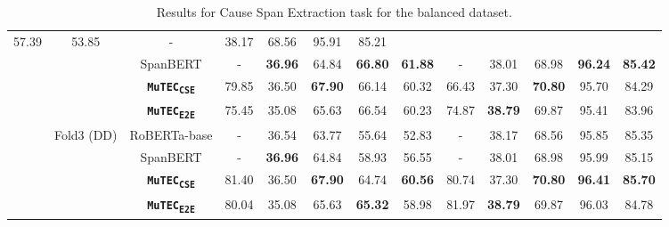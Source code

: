 \documentclass{article}
\newcommand{\subone}{\textbf{\texttt{MuTEC\textsubscript{CSE}}}}
\newcommand{\overall}{\textbf{\texttt{MuTEC\textsubscript{E2E}}}}
\begin{document}
\begin{table*}[h]
{\begin{tabular}{|c|c|c|ccccc|ccccc|}
  \multicolumn{1}{c|}{57.39} &
  53.85 &
  \multicolumn{1}{c|}{-} &
  \multicolumn{1}{c|}{38.17} &
  \multicolumn{1}{c|}{68.56} &
  \multicolumn{1}{c|}{95.91} &
  85.21
   \\ \cline{3-13} 
 &
   &
  SpanBERT &
  \multicolumn{1}{c|}{-} &
  \multicolumn{1}{c|}{\textbf{36.96}} &
  \multicolumn{1}{c|}{64.84} &
  \multicolumn{1}{c|}{\textbf{66.80}} &
   \textbf{61.88} &
  \multicolumn{1}{c|}{-} &
  \multicolumn{1}{c|}{38.01} &
  \multicolumn{1}{c|}{68.98} &
  \multicolumn{1}{c|}{\textbf{96.24}} &
  \textbf{85.42}
   \\ \cline{3-13} 
 &
   &
  \subone &
  \multicolumn{1}{c|}{79.85} &
  \multicolumn{1}{c|}{36.50} &
  \multicolumn{1}{c|}{\textbf{67.90}} &
  \multicolumn{1}{c|}{66.14} &
  60.32 &
  \multicolumn{1}{c|}{66.43} &
  \multicolumn{1}{c|}{37.30} &
  \multicolumn{1}{c|}{\textbf{70.80}} &
  \multicolumn{1}{c|}{95.70} &
  84.29 
  \\ \cline{3-13} 
 &
   &
  \overall &
  \multicolumn{1}{c|}{75.45} &
  \multicolumn{1}{c|}{35.08} &
  \multicolumn{1}{c|}{65.63} &
  \multicolumn{1}{c|}{66.54} &
  60.23 &
  \multicolumn{1}{c|}{74.87} &
  \multicolumn{1}{c|}{\textbf{38.79}} &
  \multicolumn{1}{c|}{69.87} &
  \multicolumn{1}{c|}{95.41} &
  83.96
   \\ \cline{2-13} 
 &
  \multirow{3}{*}{Fold3 (DD)} &
  RoBERTa-base &
  \multicolumn{1}{c|}{-} &
  \multicolumn{1}{c|}{36.54} &
  \multicolumn{1}{c|}{63.77} &
  \multicolumn{1}{c|}{55.64} &
   52.83 &
  \multicolumn{1}{c|}{-} &
  \multicolumn{1}{c|}{38.17} &
  \multicolumn{1}{c|}{68.56} &
  \multicolumn{1}{c|}{95.85} &
  85.35
   \\ \cline{3-13} 
 &
   &
  SpanBERT &
  \multicolumn{1}{c|}{-} &
  \multicolumn{1}{c|}{\textbf{36.96}} &
  \multicolumn{1}{c|}{64.84} &
  \multicolumn{1}{c|}{58.93} &
   56.55 &
  \multicolumn{1}{c|}{-} &
  \multicolumn{1}{c|}{38.01} &
  \multicolumn{1}{c|}{68.98} &
  \multicolumn{1}{c|}{95.99} &
  85.15
   \\ \cline{3-13} 
 &
   &
  \subone &
  \multicolumn{1}{c|}{81.40} &
  \multicolumn{1}{c|}{36.50} &
  \multicolumn{1}{c|}{\textbf{67.90}} &
  \multicolumn{1}{c|}{64.74} &
   \textbf{60.56} &
  \multicolumn{1}{c|}{80.74} &
  \multicolumn{1}{c|}{37.30} &
  \multicolumn{1}{c|}{\textbf{70.80}} &
  \multicolumn{1}{c|}{\textbf{96.41}} &
  \textbf{85.70}
  \\ \cline{3-13} 
 &
   &
  \overall &
  \multicolumn{1}{c|}{80.04} &
  \multicolumn{1}{c|}{35.08} &
  \multicolumn{1}{c|}{65.63} &
  \multicolumn{1}{c|}{\textbf{65.32}} &
  58.98 &
  \multicolumn{1}{c|}{81.97} &
  \multicolumn{1}{c|}{\textbf{38.79}} &
  \multicolumn{1}{c|}{69.87} &
  \multicolumn{1}{c|}{96.03} &
  84.78
   \\ \hline

\end{tabular}
}
\caption{Results for Cause Span Extraction task for the balanced dataset.} 
\label{tab:sub1_balanced}
\end{table*}
\end{document}
